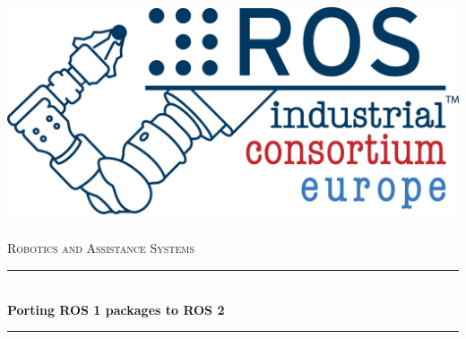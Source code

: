\documentclass[12pt,a4paper,oneside]{report}
\begin{document}
\begin{titlepage}
	\newcommand{\HRule}{\rule{\linewidth}{0.5mm}} %
	\center %
	
	\includegraphics[scale = 0.9]{images/logo.png}\\[2cm] %
	
	\\[1.5cm] %
	\textsc{\Large Robotics and Assistance Systems}\\[0.5cm] %
	
	
	\HRule \\[0.4cm]
	{ \huge \bfseries Porting ROS 1 packages to ROS 2}\\[0.4cm] %
	\HRule \\[1.5cm]
	
	\vspace{25mm}
%			
%			


\end{titlepage}
\end{document}
